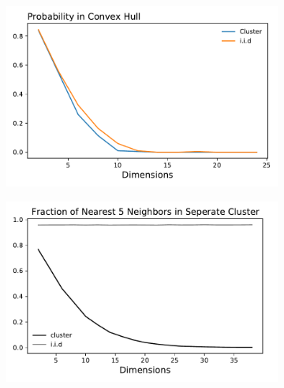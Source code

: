 \documentclass[a4paper,12pt]{article}
\begin{document}
\begin{figure}[htbp]
\centering
\begin{subfigure}{.48\textwidth}
    \centering
    \includegraphics[width=.95\linewidth]{figures/framework/iid_cluster.pdf}
\end{subfigure}
\begin{subfigure}{.48\textwidth}
    \centering
    \includegraphics[width=.95\linewidth]{figures/framework/nearest_neighbors_increasing_correlation.pdf}
\end{subfigure}
\end{figure}
\end{document}

